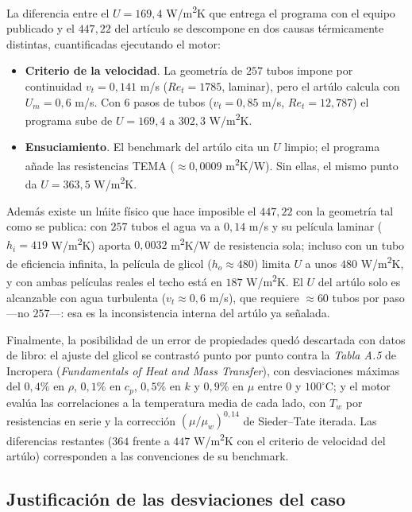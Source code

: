 \documentclass[11pt,a4paper]{article}
\begin{document}
La diferencia entre el $U = 169{,}4$ W/m\textsuperscript{2}K que entrega el
programa con el equipo publicado y el $447{,}22$ del art\'iculo se
descompone en dos causas t\'ermicamente distintas, cuantificadas
ejecutando el motor:

\begin{itemize}[leftmargin=1.4em]
\item \textbf{Criterio de la velocidad}. La geometr\'ia de $257$ tubos
impone por continuidad $v_t = 0{,}141$ m/s ($Re_t = 1785$, laminar), pero el
art\'ulo calcula con $U_m = 0{,}6$ m/s. Con $6$ pasos de tubos
($v_t = 0{,}85$ m/s, $Re_t = 12{,}787$) el programa sube de $U = 169{,}4$ a
$302{,}3$ W/m\textsuperscript{2}K.
\item \textbf{Ensuciamiento}. El benchmark del art\'ulo cita un $U$
limpio; el programa a\~nade las resistencias TEMA ($\approx 0{,}0009$
m\textsuperscript{2}K/W). Sin ellas, el mismo punto da
$U = 363{,}5$ W/m\textsuperscript{2}K.
\end{itemize}

Adem\'as existe un l\'mite f\'isico que hace imposible el $447{,}22$ con
la geometr\'ia tal como se publica: con $257$ tubos el agua va a $0{,}14$
m/s y su pel\'icula laminar ($h_i = 419$
W/m\textsuperscript{2}K) aporta $0{,}0032$
m\textsuperscript{2}K/W de resistencia sola; incluso con un tubo de
eficiencia infinita, la pel\'icula de glicol ($h_o \approx 480$) limita
$U$ a unos $480$ W/m\textsuperscript{2}K, y con ambas pel\'iculas reales
el techo est\'a en $187$ W/m\textsuperscript{2}K. El $U$ del art\'ulo
solo es alcanzable con agua turbulenta ($v_t \approx 0{,}6$ m/s), que
requiere $\approx 60$ tubos por paso ---no $257$---: esa es la
inconsistencia interna del art\'ulo ya se\~nalada.

Finalmente, la posibilidad de un error de propiedades qued\'o descartada
con datos de libro: el ajuste del glicol se contrast\'o punto por punto
contra la \emph{Tabla A.5} de Incropera (\emph{Fundamentals of Heat and
Mass Transfer}), con desviaciones m\'aximas del $0{,}4\%$ en $\rho$,
$0{,}1\%$ en $c_p$, $0{,}5\%$ en $k$ y $0{,}9\%$ en $\mu$ entre
$0$ y $100^\circ$C; y el motor eval\'ua las correlaciones a la temperatura
media de cada lado, con $T_w$ por resistencias en serie y la correcci\'on
$(\mu/\mu_w)^{0{,}14}$ de Sieder--Tate iterada. Las diferencias restantes
($364$ frente a $447$ W/m\textsuperscript{2}K con el criterio de velocidad
del art\'ulo) corresponden a las convenciones de su benchmark.

\subsection{Justificaci\'on de las desviaciones del caso}
\label{sec:tan-justificacion}
\end{document}
